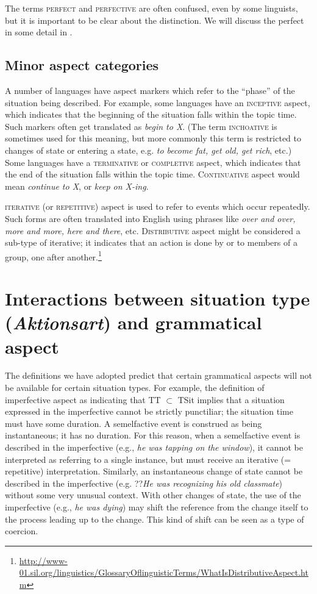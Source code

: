 The terms \textsc{perfect} and \textsc{perfective} are often confused, even by some linguists, but it is important to be clear about the distinction. We will discuss the perfect in some detail in .


\subsection{Minor aspect categories}\label{sec:20.4.4}

A number of languages have aspect markers which refer to the “phase” of the situation being described. For example, some languages have an \textsc{inceptive} aspect, which indicates that the beginning of the situation falls within the topic time. Such markers often get translated as \textit{begin to X}. (The term \textsc{inchoative} is sometimes used for this meaning, but more commonly this term is restricted to changes of state or entering a state, e.g. \textit{to become fat, get old, get rich}, etc.) Some languages have a \textsc{terminative} or \textsc{completive} aspect, which indicates that the end of the situation falls within the topic time. \textsc{Continuative} aspect would mean \textit{continue to X}, or \textit{keep on X-ing}.



\textsc{iterative} (or \textsc{repetitive}) aspect is used to refer to events which occur repeatedly. Such forms are often translated into English using phrases like \textit{over and over, more and more, here and there}, etc. \textsc{Distributive} aspect might be considered a sub-type of iterative; it indicates that an action is done by or to members of a group, one after another.\footnote{\url{http://www-01.sil.org/linguistics/GlossaryOflinguisticTerms/WhatIsDistributiveAspect.htm}} 


\section{Interactions between situation type (\textit{Aktionsart}) and grammatical aspect}\label{sec:20.5}

The definitions we have adopted predict that certain grammatical aspects will not be available for certain situation types. For example, the definition of imperfective aspect as indicating that TT ${\subset}$ TSit implies that a situation expressed in the imperfective cannot be strictly punctiliar; the situation time must have some duration. A semelfactive event is construed as being instantaneous; it has no duration. For this reason, when a semelfactive event is described in the imperfective (e.g., \textit{he was tapping on the window}), it cannot be interpreted as referring to a single instance, but must receive an iterative (= repetitive) interpretation. Similarly, an instantaneous change of state cannot be described in the imperfective (e.g. ??\textit{He was recognizing his old classmate}) without some very unusual context. With other changes of state, the use of the imperfective (e.g., \textit{he was dying}) may shift the reference from the change itself to the process leading up to the change. This kind of shift can be seen as a type of coercion.



